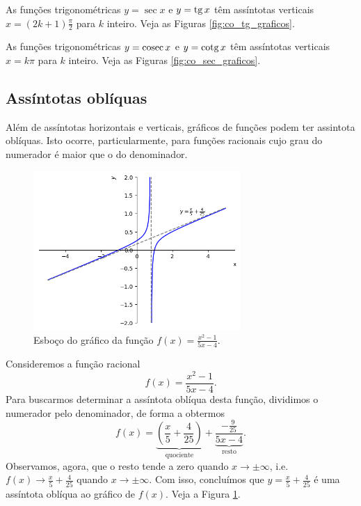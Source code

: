 \begin{ex}
  As funções trigonométricas $y = \sec x$ e $\displaystyle y = \operatorname{tg} x$ têm assíntotas verticais $x = (2k+1)\frac{\pi}{2}$ para $k$ inteiro. Veja as Figuras \ref{fig:co_tg_graficos}.
\end{ex}

\begin{ex}
  As funções trigonométricas $y = \operatorname{cosec} x$ e $\displaystyle y = \operatorname{cotg} x$ têm assíntotas verticais $x = k\pi$ para $k$ inteiro. Veja as Figuras \ref{fig:co_sec_graficos}.
\end{ex}

\subsection{Assíntotas oblíquas}

Além de assíntotas horizontais e verticais, gráficos de funções podem ter assintota oblíquas. Isto ocorre, particularmente, para funções racionais cujo grau do numerador é maior que o do denominador.

\begin{figure}[H]
  \centering
  \includegraphics[width=0.7\textwidth]{./cap_lim/dados/fig_ex_ass_obl/fig_ex_ass_obl}
  \caption{Esboço do gráfico da função $\displaystyle f(x) = \frac{x^2-1}{5x-4}$.}
  \label{fig:ex_ass_obl}
\end{figure}


\begin{ex}
  Consideremos a função racional
  \begin{equation}
    f(x) = \frac{x^2-1}{5x-4}.
  \end{equation}
  Para buscarmos determinar a assíntota oblíqua desta função, dividimos o numerador pelo denominador, de forma a obtermos
  \begin{equation}
    f(x) = \underbrace{\left(\frac{x}{5}+\frac{4}{25}\right)}_{\text{quociente}} + \underbrace{\frac{-\frac{9}{25}}{5x-4}}_{\text{resto}}.
  \end{equation}
  Observamos, agora, que o resto tende a zero quando $x\to\pm\infty$, i.e. $\displaystyle f(x)\to \frac{x}{5}+\frac{4}{25}$ quando $x\to\pm\infty$. Com isso, concluímos que $\displaystyle y = \frac{x}{5}+\frac{4}{25}$ é uma assíntota oblíqua ao gráfico de $f(x)$. Veja a Figura \ref{fig:ex_ass_obl}.
\end{ex}

